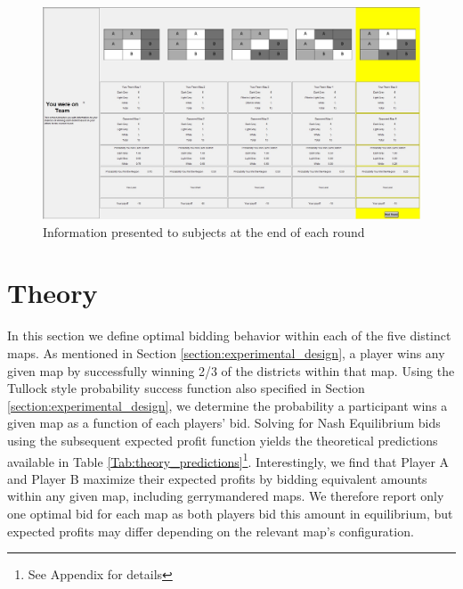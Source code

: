 \documentclass[AER]{AEA}
\begin{document}
\begin{figure}[h]
\centering
\includegraphics[scale=0.2]{informational_screen.jpg}
\caption{Information presented to subjects at the end of each round}
\label{fig:info_screen}
\end{figure}

\section{Theory}
\label{section:Theory}

In this section we define optimal bidding behavior within each of the five distinct maps. As mentioned in Section \ref{section:experimental_design}, a player wins any given map by successfully winning 2/3 of the districts within that map. Using the Tullock style probability success function also specified in Section \ref{section:experimental_design}, we determine the probability a participant wins a given map as a function of each players' bid. Solving for Nash Equilibrium bids using the subsequent expected profit function yields the theoretical predictions available in Table \ref{Tab:theory_predictions}\footnote{See Appendix for details}. Interestingly, we find that Player A and Player B maximize their expected profits by bidding equivalent amounts within any given map, including gerrymandered maps. We therefore report only one optimal bid for each map as both players bid this amount in equilibrium, but expected profits may differ depending on the relevant map's configuration.
\end{document}
